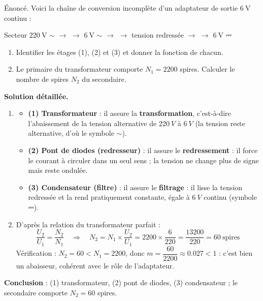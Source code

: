 \documentclass[11pt]{article}
\begin{document}
\begin{exoresolu}
Énoncé. Voici la chaîne de conversion incomplète d'un adaptateur de sortie $6\ \text{V}$ continu :
\begin{center}
Secteur $220\ \text{V}$ $\sim$ $\longrightarrow$  $\longrightarrow$ $6\ \text{V}$ $\sim$ $\longrightarrow$  $\longrightarrow$ tension redressée $\longrightarrow$  $\longrightarrow$ $6\ \text{V}$ ⎓
\end{center}
\begin{enumerate}
\item Identifier les étages (1), (2) et (3) et donner la fonction de chacun.
\item Le primaire du transformateur comporte $N_1 = \num{2200}$ spires. Calculer le nombre de spires $N_2$ du secondaire.
\end{enumerate}
\tcblower
\textbf{Solution détaillée.}
\begin{enumerate}
\item \begin{itemize}
\item \textbf{(1) Transformateur} : il assure la \textbf{transformation}, c'est-à-dire l'abaissement de la tension alternative de $\SI{220}{V}$ à $\SI{6}{V}$ (la tension reste alternative, d'où le symbole $\sim$).
\item \textbf{(2) Pont de diodes (redresseur)} : il assure le \textbf{redressement} : il force le courant à circuler dans un seul sens ; la tension ne change plus de signe mais reste ondulée.
\item \textbf{(3) Condensateur (filtre)} : il assure le \textbf{filtrage} : il lisse la tension redressée et la rend pratiquement constante, égale à $\SI{6}{V}$ continu (symbole ⎓).
\end{itemize}
\item D'après la relation du transformateur parfait :
\[ \frac{U_2}{U_1} = \frac{N_2}{N_1} \quad \Longrightarrow \quad N_2 = N_1 \times \frac{U_2}{U_1} = 2200 \times \frac{6}{220} = \frac{\num{13200}}{220} = 60 \ \text{spires} \]
Vérification : $N_2 = 60 < N_1 = \num{2200}$, donc $m = \dfrac{60}{2200} \approx \num{0,027} < 1$ : c'est bien un abaisseur, cohérent avec le rôle de l'adaptateur.
\end{enumerate}
\textbf{Conclusion} : (1) transformateur, (2) pont de diodes, (3) condensateur ; le secondaire comporte $N_2 = 60$ spires.
\end{exoresolu}
\end{document}
